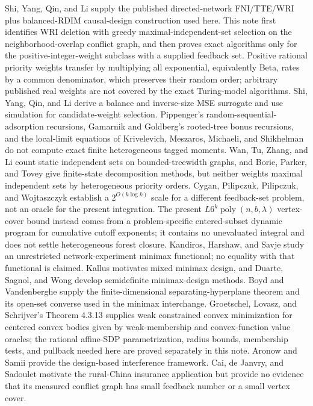 \documentclass{article}
\begin{document}
Shi, Yang, Qin, and Li supply the published directed-network FNI/TTE/WRI plus balanced-RDIM causal-design construction used here. This note first identifies WRI deletion with greedy maximal-independent-set selection on the neighborhood-overlap conflict graph, and then proves exact algorithms only for the positive-integer-weight subclass with a supplied feedback set. Positive rational priority weights transfer by multiplying all exponential, equivalently Beta, rates by a common denominator, which preserves their random order; arbitrary published real weights are not covered by the exact Turing-model algorithms. Shi, Yang, Qin, and Li derive a balance and inverse-size MSE surrogate and use simulation for candidate-weight selection. Pippenger's random-sequential-adsorption recursions, Gamarnik and Goldberg's rooted-tree bonus recursions, and the local-limit equations of Krivelevich, Meszaros, Michaeli, and Shikhelman do not compute exact finite heterogeneous tagged moments. Wan, Tu, Zhang, and Li count static independent sets on bounded-treewidth graphs, and Borie, Parker, and Tovey give finite-state decomposition methods, but neither weights maximal independent sets by heterogeneous priority orders. Cygan, Pilipczuk, Pilipczuk, and Wojtaszczyk establish a \(2^{O(k\log k)}\) scale for a different feedback-set problem, not an oracle for the present integration. The present \(L6^k\operatorname{poly}(n,b,\lambda)\) vertex-cover bound instead comes from a problem-specific entered-subset dynamic program for cumulative cutoff exponents; it contains no unevaluated integral and does not settle heterogeneous forest closure. Kandiros, Harshaw, and Savje study an unrestricted network-experiment minimax functional; no equality with that functional is claimed. Kallus motivates mixed minimax design, and Duarte, Sagnol, and Wong develop semidefinite minimax-design methods. Boyd and Vandenberghe supply the finite-dimensional separating-hyperplane theorem and its open-set converse used in the minimax interchange. Groetschel, Lovasz, and Schrijver's Theorem 4.3.13 supplies weak constrained convex minimization for centered convex bodies given by weak-membership and convex-function value oracles; the rational affine-SDP parametrization, radius bounds, membership tests, and pullback needed here are proved separately in this note. Aronow and Samii provide the design-based interference framework. Cai, de Janvry, and Sadoulet motivate the rural-China insurance application but provide no evidence that its measured conflict graph has small feedback number or a small vertex cover.
\end{document}
